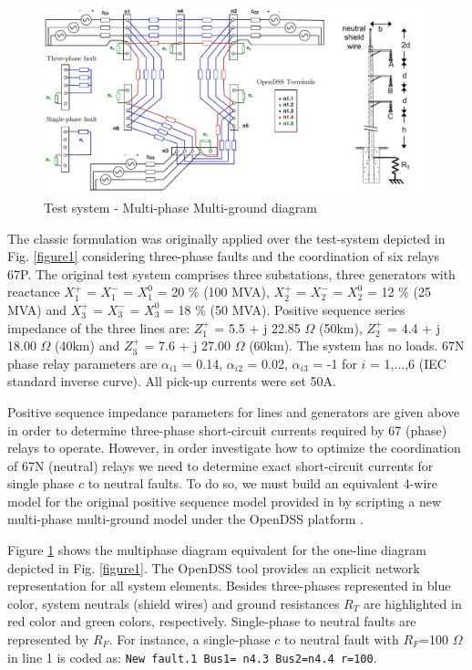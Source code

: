 \documentclass[letterpaper, 10 pt, conference]{IEEEtran}
\begin{document}
                 \begin{figure}[t!] \centerline{
     \includegraphics[width=12.0cm]{images/figure2.pdf}}
       \caption{Test system - Multi-phase Multi-ground diagram}
      \label{figure2}
        \end{figure}



The classic formulation was originally applied over the test-system depicted in Fig. \ref{figure1} considering three-phase faults and the coordination of six relays 67P.
The original test system comprises three substations, three generators with reactance $X^+_1$ = $X^-_1$ = $X^0_1$ = 20  \% (100 MVA), $X^+_2$ = $X^-_2$ = $X^0_2$ = 12 \% (25 MVA) and $X^+_3$ = $X^-_3$ = $X^0_3$ = 18 \% (50 MVA). Positive sequence series impedance of the three lines are:
 $Z^+_1$ = 5.5 + j 22.85 $\Omega$ (50km), $Z^+_2$ = 4.4 + j 18.00 $\Omega$ (40km) and $Z^+_3$ = 7.6 + j 27.00 $\Omega$ (60km). The system has no loads.
  67N phase relay parameters are $\alpha_{i1}$ = 0.14, $\alpha_{i2}$ = 0.02, $\alpha_{i3}$ = -1 for $i$ = 1,...,6 (IEC standard inverse curve). All pick-up currents were set 50A.

Positive sequence impedance parameters for lines and generators are given above in order to determine three-phase short-circuit currents required by  67 (phase) relays to operate. However, in order investigate how to optimize the coordination of  67N (neutral) relays we need to determine exact short-circuit currents for single phase $c$ to neutral faults. To do so, we must build an equivalent 4-wire model for the original positive sequence model provided in \cite{urdaneta1988}  by scripting a new multi-phase multi-ground model under the OpenDSS platform \cite{opendss}.

Figure \ref{figure2} shows the multiphase diagram equivalent for the one-line diagram depicted in Fig. \ref{figure1}. The OpenDSS tool provides an explicit network representation for all system elements.
Besides  three-phases represented in blue color, system neutrals (shield wires) and ground resistances $R_T$ are highlighted in red color and green colors, respectively. Single-phase to neutral faults are represented by $R_F$. For instance, a single-phase $c$ to neutral fault with $R_F$=100 $\Omega$ in line 1 is coded as: \scriptsize
 \texttt{New fault.1   Bus1= n4.3   Bus2=n4.4 r=100}. \normalsize
\end{document}
